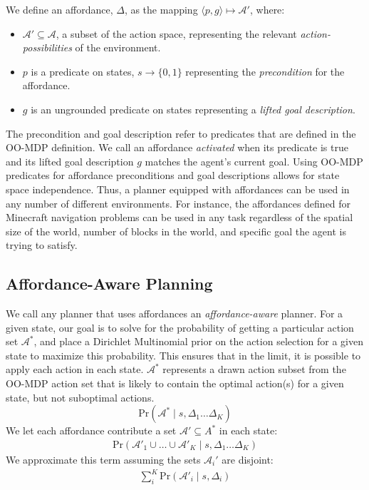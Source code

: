 \documentclass[conference]{IEEEtran}
\begin{document}
We define an affordance, $\Delta$,
as the mapping $\langle p,g\rangle \longmapsto \mathcal{A}'$,
where:
\begin{itemize}
\item[] $\mathcal{A}' \subseteq \mathcal{A}$, a subset of the action space, representing the relevant {\it action-possibilities} of the environment.
\item[] $p$ is a predicate on states, $s \longrightarrow \{$0$, 1\}$
  representing the {\em precondition} for the affordance.
\item[] $g$ is an ungrounded predicate on states representing a {\it lifted goal description}.
\end{itemize}
The precondition and goal description refer to predicates that are defined in the OO-MDP definition.
We call an affordance {\it activated} when its predicate is true and its lifted goal description $g$ matches the agent's current goal. 
Using OO-MDP predicates for affordance preconditions and goal descriptions 
allows for state space independence. Thus, a planner equipped with
affordances can be used in any number of different environments. For instance, the affordances defined for Minecraft 
navigation problems can be used in any task regardless of the spatial size of the world, 
number of blocks in the world, and specific goal the agent is trying to satisfy.

\subsection{Affordance-Aware Planning}
We call any planner that
uses affordances an {\it affordance-aware} planner. For a given state, 
our goal is to solve for the probability of getting a particular action set $\mathcal{A}^*$, and place a Dirichlet Multinomial
prior on the action selection for a given state to maximize this probability.
This ensures that in the limit, it is possible to apply each action in each state. $\mathcal{A}^*$ represents
a drawn action subset from the OO-MDP action set that is likely to contain the optimal action(s) for a given state,
but not suboptimal actions.
\begin{equation}
\text{Pr}(\mathcal{A}^* \mid s, \Delta_1 \dots \Delta_K)
\end{equation}
We let each affordance contribute a set $\mathcal{A}' \subseteq A^*$ in each state:
\begin{align}
\text{Pr}(\mathcal{A}'_1 \cup \ldots \cup \mathcal{A}'_K \mid s, \Delta_1 \dots \Delta_K)
\end{align}
We approximate this term assuming the sets $\mathcal{A}_i'$ are disjoint:
\begin{align}
\sum_i^K \text{Pr}(\mathcal{A}'_i \mid s, \Delta_i)
\end{align}
\end{document}
